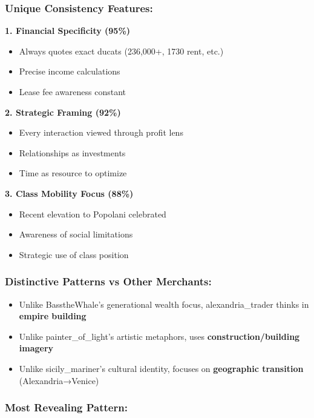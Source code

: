 \documentclass[11pt,a4paper]{article}
\begin{document}
\subsubsection{Unique Consistency Features:}

\textbf{1. Financial Specificity (95\%)}
\begin{itemize}
\item Always quotes exact ducats (236,000+, 1730 rent, etc.)
\item Precise income calculations
\item Lease fee awareness constant
\end{itemize}

\textbf{2. Strategic Framing (92\%)}
\begin{itemize}
\item Every interaction viewed through profit lens
\item Relationships as investments
\item Time as resource to optimize
\end{itemize}

\textbf{3. Class Mobility Focus (88\%)}
\begin{itemize}
\item Recent elevation to Popolani celebrated
\item Awareness of social limitations
\item Strategic use of class position
\end{itemize}

\subsubsection{Distinctive Patterns vs Other Merchants:}

\begin{itemize}
\item Unlike BasstheWhale's generational wealth focus, alexandria\_trader thinks in \textbf{empire building}
\item Unlike painter\_of\_light's artistic metaphors, uses \textbf{construction/building imagery}
\item Unlike sicily\_mariner's cultural identity, focuses on \textbf{geographic transition} (Alexandria→Venice)
\end{itemize}

\subsubsection{Most Revealing Pattern:}
\end{document}
